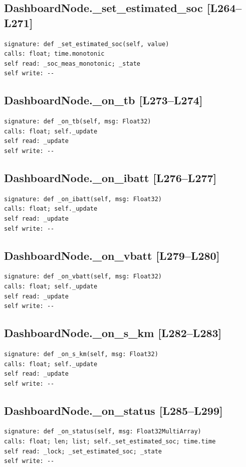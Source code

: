 \documentclass[a4paper,10pt,oneside]{book}
\begin{document}
\subsection*{DashboardNode.\_set\_estimated\_soc [L264--L271]}
\begin{lstlisting}[numbers=none]
signature: def _set_estimated_soc(self, value)
calls: float; time.monotonic
self read: _soc_meas_monotonic; _state
self write: --
\end{lstlisting}
\subsection*{DashboardNode.\_on\_tb [L273--L274]}
\begin{lstlisting}[numbers=none]
signature: def _on_tb(self, msg: Float32)
calls: float; self._update
self read: _update
self write: --
\end{lstlisting}
\subsection*{DashboardNode.\_on\_ibatt [L276--L277]}
\begin{lstlisting}[numbers=none]
signature: def _on_ibatt(self, msg: Float32)
calls: float; self._update
self read: _update
self write: --
\end{lstlisting}
\subsection*{DashboardNode.\_on\_vbatt [L279--L280]}
\begin{lstlisting}[numbers=none]
signature: def _on_vbatt(self, msg: Float32)
calls: float; self._update
self read: _update
self write: --
\end{lstlisting}
\subsection*{DashboardNode.\_on\_s\_km [L282--L283]}
\begin{lstlisting}[numbers=none]
signature: def _on_s_km(self, msg: Float32)
calls: float; self._update
self read: _update
self write: --
\end{lstlisting}
\subsection*{DashboardNode.\_on\_status [L285--L299]}
\begin{lstlisting}[numbers=none]
signature: def _on_status(self, msg: Float32MultiArray)
calls: float; len; list; self._set_estimated_soc; time.time
self read: _lock; _set_estimated_soc; _state
self write: --
\end{lstlisting}
\end{document}
